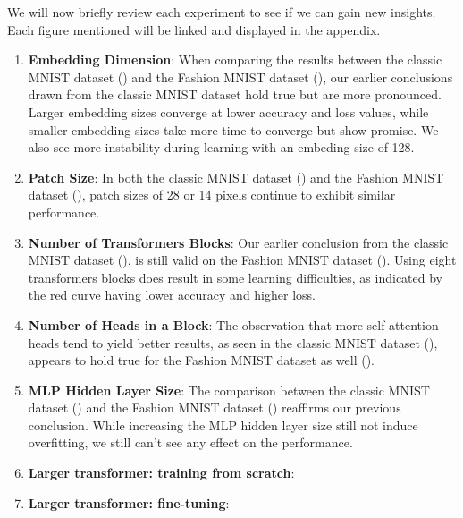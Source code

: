 We will now briefly review each experiment to see if we can gain new insights. Each figure mentioned will be linked and displayed in the appendix.
\begin{enumerate}
    \item \textbf{Embedding Dimension}: When comparing the results between the classic MNIST dataset () and the Fashion MNIST dataset (), our earlier conclusions drawn from the classic MNIST dataset hold true but are more pronounced. Larger embedding sizes converge at lower accuracy and loss values, while smaller embedding sizes take more time to converge but show promise. We also see more instability during learning with an embeding size of 128.

    \item \textbf{Patch Size}: In both the classic MNIST dataset () and the Fashion MNIST dataset (), patch sizes of 28 or 14 pixels continue to exhibit similar performance. 

    \item \textbf{Number of Transformers Blocks}: Our earlier conclusion from the classic MNIST dataset (), is still valid on the Fashion MNIST dataset (). Using eight transformers blocks does result in some learning difficulties, as indicated by the red curve having lower accuracy and higher loss.

    \item \textbf{Number of Heads in a Block}: The observation that more self-attention heads tend to yield better results, as seen in the classic MNIST dataset (), appears to hold true for the Fashion MNIST dataset as well ().

    \item \textbf{MLP Hidden Layer Size}: The comparison between the classic MNIST dataset () and the Fashion MNIST dataset () reaffirms our previous conclusion. While increasing the MLP hidden layer size still not induce overfitting, we still can't see any effect on the performance.
    
    \item \textbf{Larger transformer: training from scratch}:
    \item \textbf{Larger transformer: fine-tuning}:
\end{enumerate}
